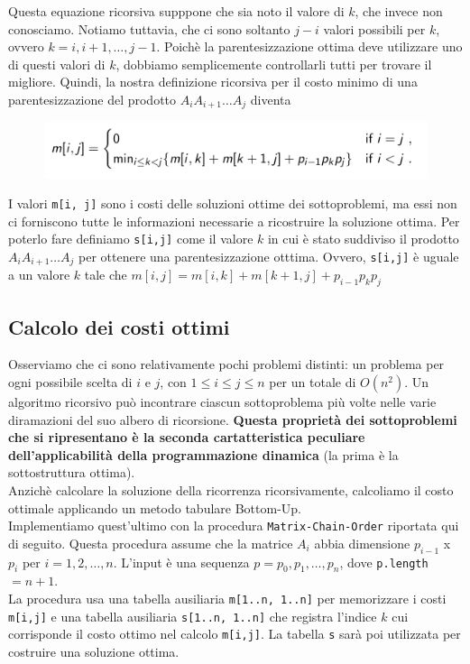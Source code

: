 Questa equazione ricorsiva supppone che sia noto il valore di $k$, che
invece non conosciamo. Notiamo tuttavia, che ci sono soltanto $j-i$
valori possibili per $k$, ovvero $k=i, i+1, \ldots, j-1$. Poichè la
parentesizzazione ottima deve utilizzare uno di questi valori di $k$,
dobbiamo semplicemente controllarli tutti per trovare il migliore.
Quindi, la nostra definizione ricorsiva per il costo minimo di una
parentesizzazione del prodotto $A_i A_{i+1} \ldots A_j$ diventa

\begin{figure}[H]
  \centering
  \includegraphics[width=15cm, keepaspectratio]{capitoli/programmazione_dinamica/imgs/matrix2.png}
\end{figure}

I valori \texttt{m[i,\ j]} sono i costi delle soluzioni ottime dei
sottoproblemi, ma essi non ci forniscono tutte le informazioni
necessarie a ricostruire la soluzione ottima. Per poterlo fare definiamo
\texttt{s[i,j]} come il valore $k$ in cui è stato suddiviso il
prodotto $A_{i} A_{i+1} \ldots A_j$ per ottenere una parentesizzazione
otttima. Ovvero, \texttt{s[i,j]} è uguale a un valore $k$ tale che
$m[i,j] = m[i,k] + m[k+1,j] + p_{i-1} p_k p_j$

\subsection{Calcolo dei costi ottimi}

Osserviamo che ci sono relativamente pochi problemi distinti: un
problema per ogni possibile scelta di $i$ e $j$, con
$1 \le i \le j \le n$ per un totale di $O(n^2)$. Un algoritmo
ricorsivo può incontrare ciascun sottoproblema più volte nelle varie
diramazioni del suo albero di ricorsione. \textbf{Questa proprietà dei
  sottoproblemi che si ripresentano è la seconda cartatteristica peculiare
  dell'applicabilità della programmazione dinamica} (la prima è la
sottostruttura ottima).\\

Anzichè calcolare la soluzione della ricorrenza ricorsivamente,
calcoliamo il costo ottimale applicando un metodo tabulare Bottom-Up.\\
Implementiamo quest'ultimo con la procedura \texttt{Matrix-Chain-Order}
riportata qui di seguito. Questa procedura assume che la matrice $A_i$
abbia dimensione $p_{i-1}$ x $p_i$ per $i=1,2,\ldots,n$. L'input è una
sequenza $p = p_0, p_1, \ldots, p_n$, dove \texttt{p.length} $= n+1$.\\
La procedura usa una tabella ausiliaria \texttt{m[1..n,\ 1..n]} per
memorizzare i costi \texttt{m[i,j]} e una tabella ausiliaria
\texttt{s[1..n,\ 1..n]} che registra l'indice $k$ cui corrisponde
il costo ottimo nel calcolo \texttt{m[i,j]}. La tabella \texttt{s}
sarà poi utilizzata per costruire una soluzione ottima.\\

